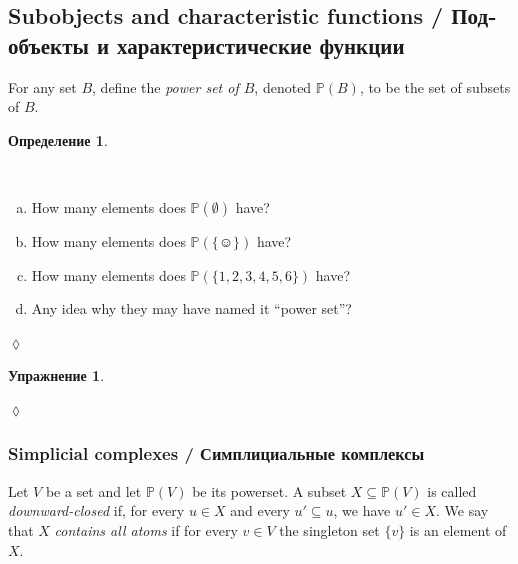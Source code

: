 \documentclass[a4paper]{book}
\def\PP{{\mathbb P}}
\def\singleton{\{\smiley\}}
\def\ss{\subseteq}
\theoremstyle{myth}
\newtheorem{excENG}[envENG]{\begin{english}Exercise\end{english}}
\newtheorem{definitionENG}[envENG]{\begin{english}Definition\end{english}}
\newenvironment{exerciseENG}{\begin{excENG}}{\hspace*{\fill}$\lozenge$\end{excENG}}
\newtheorem{excRUS}[envRUS]{Упражнение}
\newtheorem{definitionRUS}[envRUS]{Определение}
\newenvironment{exerciseRUS}{\begin{excRUS}}{\hspace*{\fill}$\lozenge$\end{excRUS}}
\def\sexc{\begin{enumerate}[a.)]\setlength{\itemsep}{.1cm}\setlength{\parskip}{.1cm}\item}
\def\next{\item}
\def\endsexc{\end{enumerate}}
\begin{document}
\begin{russian}

\subsection{Subobjects and characteristic functions / Подобъекты и характеристические функции}

\begin{definitionENG}\label{def:power set}
For any set $B$, define the {\em power set of $B$}, denoted $\PP(B)$,\index{a symbol!$\PP$} to be the set of subsets of $B$.
\end{definitionENG}

\begin{definitionRUS}\label{def:power set}
 
\end{definitionRUS}

\begin{exerciseENG}\label{exc:size of power sets}~
\sexc How many elements does $\PP(\emptyset)$ have? 
\next How many elements does $\PP(\singleton)$ have? 
\next How many elements does $\PP(\{1,2,3,4,5,6\})$ have? 
\next Any idea why they may have named it “power set”?
\endsexc
\end{exerciseENG}

\begin{exerciseRUS}\label{exc:size of power sets}~
 
\end{exerciseRUS}


\subsubsection{Simplicial complexes / Симплициальные комплексы}\label{sec:simplicial complex}

\begin{definitionENG}\label{def:simplicial complex}
Let $V$ be a set and let $\PP(V)$ be its powerset. A subset $X\ss\PP(V)$ is called {\em downward-closed} if, for every $u\in X$ and every $u'\ss u$, we have $u'\in X$. We say that $X$ {\em contains all atoms} if for every $v\in V$ the singleton set $\{v\}$ is an element of $X$. 


\end{definitionENG}
\end{russian}
\end{document}
